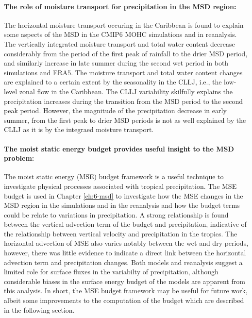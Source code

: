 \paragraph{The role of moisture transport for precipitation in the MSD region:}
The horizontal moisture transport occuring in the Caribbean is found to explain some aspects of the MSD in the CMIP6 MOHC simulations and in reanalysis. 
The vertically integrated moisture transport and total water content decrease considerably from the period of the first peak of rainfall to the drier MSD period, and similarly increase in late summer during the second wet period in both simulations and ERA5.
The moisture transport and total water content changes are explained to a certain extent by the seasonality in the CLLJ, i.e., the low-level zonal flow in the Caribbean. 
The CLLJ variability skilfully explains the precipitation increases during the transition from the MSD period to the second peak period. 
However, the magnitude of the precipitation decrease in early summer, from the first peak to drier MSD periods is not as well explained by the CLLJ as it is by the integraed moisture transport. 

\paragraph{The moist static energy budget provides useful insight to the MSD problem:}
The moist static energy (MSE) budget framework is a useful technique to investigate physical processes associated with tropical precipitation. 
The MSE budget is used in Chapter \ref{ch:6-msd} to investigate how the MSE changes in the MSD region in the simulations and in the reanalysis and how the budget terms could be relate to variations in precipitation. 
A strong relationship is found between the vertical advection term of the budget and precipitation, indicative of the relationship between vertical velocity and precipitation in the tropics. %
The horizontal advection of MSE also varies notably between the wet and dry periods, however, there was little evidence to indicate a direct link between the horizontal advection term and precipitation changes. 
Both models and reanalysis suggest a limited role for surface fluxes in the variabilty of precipitation, although considerable biases in the surface energy budget of the models are apparent from this analysis. 
In short, the MSE budget framework may be useful for future work, albeit some improvements to the computation of the budget which are described in the following section.

